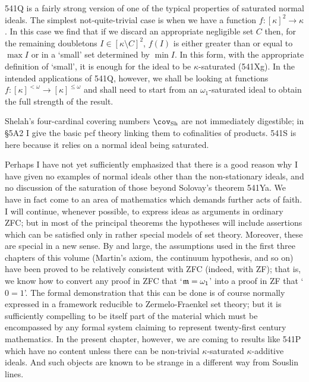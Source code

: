 {541Q is a fairly strong version of one of the typical properties of
saturated normal ideals.   The simplest not-quite-trivial case is when
we have a function $f:[\kappa]^2\to\kappa$.   In this case we find that
if we discard an appropriate
negligible set $C$ then, for the remaining doubletons
$I\in[\kappa\setminus C]^2$, $f(I)$
is either greater than or equal to $\max I$ or in a `small' set determined
by $\min I$.   In this form, with the appropriate definition of `small', it
is enough for the ideal to be
$\kappa$-saturated (541Xg).   In the intended applications of 541Q,
however, we shall be looking at functions
$f:[\kappa]^{<\omega}\to[\kappa]^{\le\omega}$ and shall need to start
from an $\omega_1$-saturated ideal to obtain the full strength of the
result.

Shelah's four-cardinal covering numbers $\covSh$ are not immediately
digestible;  in \S5A2 I give the basic pcf theory linking them to
cofinalities of products.   541S is here because it relies on a normal
ideal being saturated.

Perhaps I have not yet sufficiently emphasized that there is a good
reason why I have given no examples of normal ideals other than the
non-stationary ideals, and no discussion of the saturation of those
beyond Solovay's theorem 541Ya.   We have in fact come to an area of
mathematics which demands further acts of faith.   I will continue,
whenever possible, to express ideas as arguments in ordinary ZFC;  but
in most of the principal theorems the hypotheses will include assertions
which can be satisfied only in rather special models of set theory.
Moreover, these are special in a new sense.   By and large, the
assumptions used in the first three chapters of this volume (Martin's
axiom, the continuum hypothesis, and so on) have been proved to be
relatively consistent with ZFC (indeed, with ZF);  that is, we know how
to convert any proof in ZFC that `$\frak m=\omega_1$' into a proof in ZF
that `$0=1$'.   The formal demonstration that this can be done is of
course normally expressed in a framework reducible to Zermelo-Fraenkel
set theory;  but it is sufficiently compelling to be itself part of the
material which must be encompassed by any formal system claiming to
represent twenty-first century mathematics.   In the present chapter,
however, we are coming to results like 541P which have no content unless
there can be non-trivial $\kappa$-saturated $\kappa$-additive ideals.
And such objects are known to be strange in a different way from Souslin
lines.

}
